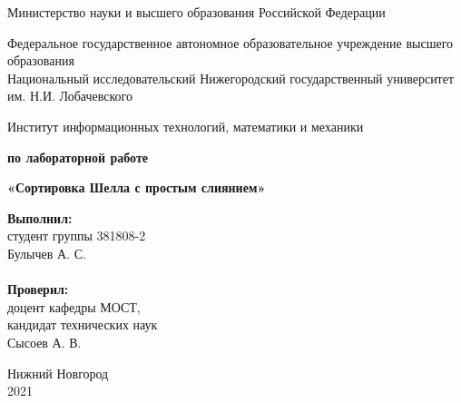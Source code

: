 \documentclass{report}
\begin{document}
\begin{titlepage}

\begin{center}
Министерство науки и высшего образования Российской Федерации
\end{center}

\begin{center}
Федеральное государственное автономное образовательное учреждение высшего образования \\
Национальный исследовательский Нижегородский государственный университет им. Н.И. Лобачевского
\end{center}

\begin{center}
Институт информационных технологий, математики и механики
\end{center}

\vspace{4em}

\begin{center}
\textbf{ по лабораторной работе} \\
\end{center}
\begin{center}
\textbf{\Large«Сортировка Шелла с простым слиянием»} \\
\end{center}

\vspace{4em}

\newbox{\lbox}
\newlength{\maxl}
\setlength{\maxl}{\wd\lbox}
\hfill\parbox{7cm}{
\hspace*{5cm}\hspace*{-5cm}\textbf{Выполнил:} \\ студент группы 381808-2 \\ Булычев А. С.\\
\\
\hspace*{5cm}\hspace*{-5cm}\textbf{Проверил:}\\ доцент кафедры МОСТ, \\ кандидат технических наук \\ Сысоев А. В.\\}
\vspace{\fill}

\begin{center} Нижний Новгород \\ 2021 \end{center}

\end{titlepage}
\end{document}
